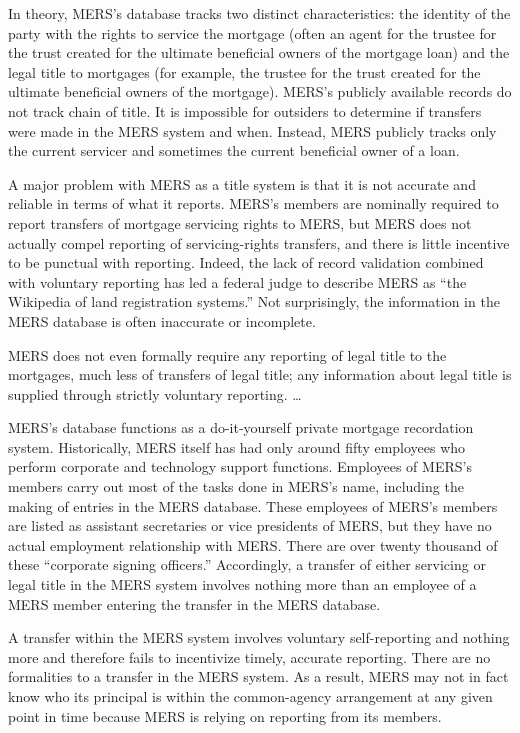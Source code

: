 In theory, MERS's database tracks two distinct characteristics: the identity of
the party with the rights to service the mortgage (often an agent for the
trustee for the trust created for the ultimate beneficial owners of the
mortgage loan) and the legal title to mortgages (for example, the trustee for
the trust created for the ultimate beneficial owners of the mortgage). MERS's
publicly available records do not track chain of title. It is impossible for
outsiders to determine if transfers were made in the MERS system and when.
Instead, MERS publicly tracks only the current servicer and sometimes the
current beneficial owner of a loan.

A major problem with MERS as a title system is that it is not accurate and
reliable in terms of what it reports. MERS's members are nominally required to
report transfers of mortgage servicing rights to MERS, but MERS does not
actually compel reporting of servicing-rights transfers, and there is little
incentive to be punctual with reporting. Indeed, the lack of record validation
combined with voluntary reporting has led a federal judge to describe MERS as
``the Wikipedia of land registration systems.'' Not surprisingly, the
information in the MERS database is often inaccurate or incomplete.

MERS does not even formally require any reporting of legal title to the
mortgages, much less of transfers of legal title; any information about legal
title is supplied through strictly voluntary reporting. \dots 

MERS's database functions as a do-it-yourself private mortgage recordation
system. Historically, MERS itself has had only around fifty employees who
perform corporate and technology support functions. Employees of MERS's members
carry out most of the tasks done in MERS's name, including the making of
entries in the MERS database. These employees of MERS's members are listed as
assistant secretaries or vice presidents of MERS, but they have no actual
employment relationship with MERS. There are over twenty thousand of these
``corporate signing officers.'' Accordingly, a transfer of either
servicing or legal title in the MERS system involves nothing more than an
employee of a MERS member entering the transfer in the MERS database.

A transfer within the MERS system involves voluntary self-reporting and nothing
more and therefore fails to incentivize timely, accurate reporting. There are
no formalities to a transfer in the MERS system. As a result, MERS may not in
fact know who its principal is within the common-agency arrangement at any
given point in time because MERS is relying on reporting from its members.

